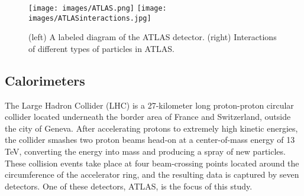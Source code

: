 \begin{figure}[t]
    \centering
    \texttt{[image: images/ATLAS.png]}
    \texttt{[image: images/ATLASinteractions.jpg]}
    \caption{(left) A labeled diagram of the ATLAS detector. (right) Interactions of different types of particles in ATLAS.}
    \label{ATLAS}
\end{figure}


\subsection{Calorimeters}


The Large Hadron Collider (LHC) is a 27-kilometer long proton-proton circular collider located underneath the border area of France and Switzerland, outside the city of Geneva. After accelerating protons to extremely high kinetic energies, the collider smashes two proton beams head-on at a center-of-mass energy of 13 TeV, converting the energy into mass and producing a spray of new particles. These collision events take place at four beam-crossing points located around the circumference of the accelerator ring, and the resulting data is captured by seven detectors. One of these detectors, ATLAS, is the focus of this study.

